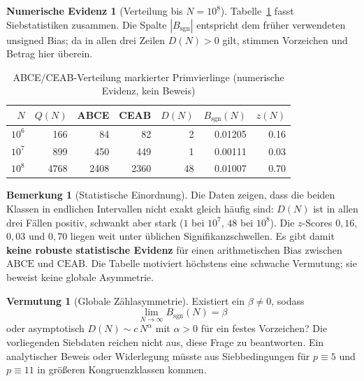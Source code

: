 \documentclass[11pt,a4paper]{article}
\theoremstyle{definition}
\newtheorem{bemerkung}[definition]{Bemerkung}
\newtheorem{numerischeevidenz}[definition]{Numerische Evidenz}
\newtheorem{vermutung}[definition]{Vermutung}
\theoremstyle{plain}
\begin{document}
	\begin{numerischeevidenz}[Verteilung bis $N=10^8$]\label{evidenz:sieve}
		Tabelle~\ref{tab:sieve} fasst Siebstatistiken zusammen. Die Spalte $|B_{\mathrm{sgn}}|$ entspricht dem früher verwendeten unsigned Bias; da in allen drei Zeilen $D(N)>0$ gilt, stimmen Vorzeichen und Betrag hier überein.
		
		\begin{table}[htbp]
			\centering
			\caption{ABCE/CEAB-Verteilung markierter Primvierlinge (numerische Evidenz, kein Beweis)}
			\label{tab:sieve}
			\begin{tabular}{@{}rrrrrrr@{}}
				\toprule
				$N$ & $Q(N)$ & ABCE & CEAB & $D(N)$ & $B_{\mathrm{sgn}}(N)$ & $z(N)$ \\
				\midrule
				$10^6$  & 166  & 84  & 82  & 2  & 0.01205 & 0.16 \\
				$10^7$  & 899  & 450 & 449 & 1  & 0.00111 & 0.03 \\
				$10^8$  & 4768 & 2408 & 2360 & 48 & 0.01007 & 0.70 \\
				\bottomrule
			\end{tabular}
		\end{table}
	\end{numerischeevidenz}
	
	\begin{bemerkung}[Statistische Einordnung]
		Die Daten zeigen, dass die beiden Klassen in endlichen Intervallen nicht exakt gleich häufig sind: $D(N)$ ist in allen drei Fällen positiv, schwankt aber stark ($1$ bei $10^7$, $48$ bei $10^8$). Die $z$-Scores $0{,}16$, $0{,}03$ und $0{,}70$ liegen weit unter üblichen Signifikanzschwellen. Es gibt damit \textbf{keine robuste statistische Evidenz} für einen arithmetischen Bias zwischen $\mathrm{ABCE}$ und $\mathrm{CEAB}$. Die Tabelle motiviert höchstens eine schwache Vermutung; sie beweist keine globale Asymmetrie.
	\end{bemerkung}
	
	\begin{vermutung}[Globale Zählasymmetrie]\label{vermutung:bias}
		Existiert ein $\beta\neq 0$, sodass
		\[
		\lim_{N\to\infty} B_{\mathrm{sgn}}(N)=\beta
		\]
		oder asymptotisch $D(N)\sim c\,N^\alpha$ mit $\alpha>0$ für ein festes Vorzeichen? Die vorliegenden Siebdaten reichen nicht aus, diese Frage zu beantworten. Ein analytischer Beweis oder Widerlegung müsste aus Siebbedingungen für $p\equiv 5$ und $p\equiv 11$ in größeren Kongruenzklassen kommen.
	\end{vermutung}
	
\end{document}
